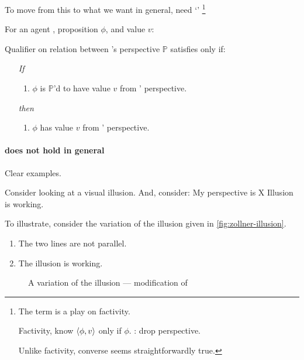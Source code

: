 \begin{note}
  To move from this to what we want in general, need `\emph{}'%
  \footnote{
    The term is a play on factivity.

    Factivity, know \(\langle \phi, v \rangle\) only if \(\phi\).
    : drop perspective.

    Unlike factivity, converse seems straightforwardly true.
  }

  \begin{principle}[\ptivity{2}]
    \label{def:perspectivity}
    For an agent \vAgent{}, proposition \(\phi\), and value \(v\):

    Qualifier on relation between \vAgent{}'s perspective \(\mathbb{P}\) satisfies \ptivity{} only if:

    \begin{enumerate}[noitemsep]
    \item[\emph{If}]
      \begin{enumerate}[label=\alph*., ref=(\alph*)]
      \item
        \(\phi\) is \(\mathbb{P}\)'d to have value \(v\) from \vAgent{}' perspective.
      \end{enumerate}
    \item[\emph{then}]
      \begin{enumerate}[label=\alph*., ref=(\alph*), resume]
      \item
        \(\phi\) has value \(v\) from \vAgent{}' perspective.
      \end{enumerate}
    \end{enumerate}
    \vspace{-\baselineskip}
  \end{principle}
\end{note}

\paragraph{ does not hold in general}

\begin{note}
  Clear examples.

  Consider looking at a visual illusion.
  And, consider:
  My perspective is X
  Illusion is working.

  To illustrate, consider the variation of the \citeauthor{Zollner:1860vx} illusion given in \autoref{fig:zollner-illusion}.

  \begin{enumerate}
  \item
    The two lines are not parallel.
  \item
    The illusion is working.
  \end{enumerate}

  \begin{figure}
    \centering
    \def\svgwidth{\columnwidth}
    
    \caption{A variation of the \citeauthor{Zollner:1860vx} illusion --- modification of ~\textcite{Fibonacci:2007vj}}
    \label{fig:zollner-illusion}
  \end{figure}
\end{note}

